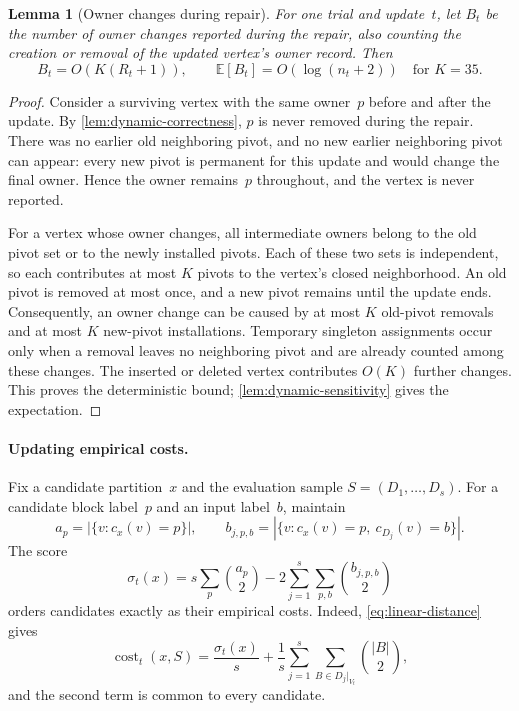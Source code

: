 \documentclass[11pt,letterpaper]{article}
\newtheorem{lemma}[theorem]{Lemma}
\theoremstyle{definition}
\theoremstyle{remark}
\newcommand{\cost}{\operatorname{cost}}
\newcommand{\E}{\mathbb{E}}
\newcommand{\1}{\mathbf{1}}
\begin{document}
\begin{lemma}[Owner changes during repair]\label{lem:owner-change-work}
For one trial and update~$t$, let $B_t$ be the number of owner changes reported during the repair, also counting the creation or removal of the updated vertex's owner record.  Then
\[
 B_t=O\!\left(K(R_t+1)\right),
 \qquad
 \E[B_t]=O(\log(n_t+2))\quad\text{for }K=35.
\]
\end{lemma}

\begin{proof}
Consider a surviving vertex with the same owner~$p$ before and after the update.  By \cref{lem:dynamic-correctness}, $p$ is never removed during the repair.  There was no earlier old neighboring pivot, and no new earlier neighboring pivot can appear: every new pivot is permanent for this update and would change the final owner.  Hence the owner remains~$p$ throughout, and the vertex is never reported.

For a vertex whose owner changes, all intermediate owners belong to the old pivot set or to the newly installed pivots.  Each of these two sets is independent, so each contributes at most $K$ pivots to the vertex's closed neighborhood.  An old pivot is removed at most once, and a new pivot remains until the update ends.  Consequently, an owner change can be caused by at most $K$ old-pivot removals and at most $K$ new-pivot installations.  Temporary singleton assignments occur only when a removal leaves no neighboring pivot and are already counted among these changes.  The inserted or deleted vertex contributes $O(K)$ further changes.  This proves the deterministic bound; \cref{lem:dynamic-sensitivity} gives the expectation.
\end{proof}

\paragraph{Updating empirical costs.}
Fix a candidate partition~$x$ and the evaluation sample $S=(D_1,\ldots,D_s)$.  For a candidate block label~$p$ and an input label~$b$, maintain
\[
 a_p=|\{v:c_x(v)=p\}|,
 \qquad
 b_{j,p,b}=|\{v:c_x(v)=p,\ c_{D_j}(v)=b\}|.
\]
The score
\begin{equation}\label{eq:dynamic-score}
 \sigma_t(x)=s\sum_p\binom{a_p}{2}
              -2\sum_{j=1}^s\sum_{p,b}\binom{b_{j,p,b}}{2}
\end{equation}
orders candidates exactly as their empirical costs.  Indeed, \cref{eq:linear-distance} gives
\[
 \cost_t(x,S)=\frac{\sigma_t(x)}s+
 \frac1s\sum_{j=1}^s\sum_{B\in D_j|_{V_t}}\binom{|B|}{2},
\]
and the second term is common to every candidate.
\end{document}
